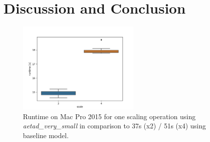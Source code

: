 \newpage
\chapter{Discussion and Conclusion}
\label{sec:Discussion}

\begin{figure}
    \centering
    \includegraphics[width=6cm]{figures/aetad_very_small_runtime.png}
    \caption{Runtime on Mac Pro 2015 for one scaling operation using \textit{aetad\_very\_small} in comparison to 37s (x2) / 51s (x4) using baseline model.}
    \label{fig:aetad_very_small_runtime}
\end{figure}


